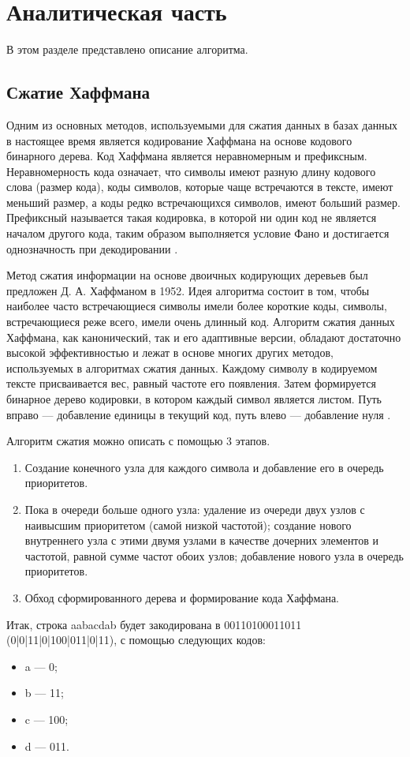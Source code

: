 \chapter{Аналитическая часть}
В этом разделе представлено описание алгоритма.

\section{Сжатие Хаффмана}

Одним из основных методов, используемыми для сжатия данных в базах данных в настоящее время является кодирование Хаффмана на основе кодового бинарного дерева.
Код Хаффмана является неравномерным и префиксным.
Неравномерность кода означает, что символы имеют разную длину кодового слова (размер кода), коды символов, которые чаще встречаются в тексте, имеют меньший размер, а коды редко встречающихся символов, имеют больший размер. 
Префиксный называется такая кодировка, в которой ни один код не является началом другого кода, таким образом выполняется условие Фано и достигается однозначность при декодировании \cite{huf}.

Метод сжатия информации на основе двоичных кодирующих деревьев был предложен Д. А. Хаффманом в 1952.
Идея алгоритма состоит в том, чтобы наиболее часто встречающиеся символы имели более короткие коды, символы, встречающиеся реже всего, имели очень длинный код.
Алгоритм сжатия данных Хаффмана, как канонический, так и его адаптивные версии, обладают достаточно высокой эффективностью и лежат в основе многих других методов, используемых в алгоритмах сжатия данных.
Каждому символу в кодируемом тексте присваивается вес, равный частоте его появления.
Затем формируется бинарное дерево кодировки, в котором каждый символ является листом.
Путь вправо --- добавление единицы в текущий код, путь влево --- добавление нуля \cite{huf}.

Алгоритм сжатия можно описать с помощью 3 этапов.
\begin{enumerate}
	\item Создание конечного узла для каждого символа и добавление его в очередь приоритетов.
	\item Пока в очереди больше одного узла: удаление из очереди двух узлов с наивысшим приоритетом (самой низкой частотой); создание нового внутреннего узла с этими двумя узлами в качестве дочерних элементов и частотой, равной сумме частот обоих узлов; добавление нового узла в очередь приоритетов.
	\item Обход сформированного дерева и формирование кода Хаффмана.
\end{enumerate}

Итак, строка aabacdab будет закодирована в 00110100011011 \\(0|0|11|0|100|011|0|11), с помощью следующих кодов:
\begin{itemize}
	\item a --- 0;
	\item b --- 11;
	\item c --- 100;
	\item d --- 011.
\end{itemize}